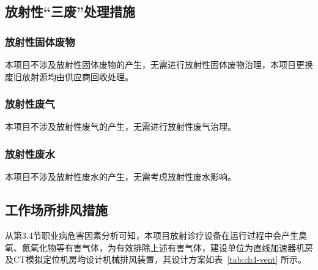 \subsection{放射性“三废”处理措施}

\subsubsection{放射性固体废物}

本项目不涉及放射性固体废物的产生，无需进行放射性固体废物治理，本项目更换废旧放射源均由供应商回收处理。

\subsubsection{放射性废气}

本项目不涉及放射性废气的产生，无需进行放射性废气治理。

\subsubsection{放射性废水}

本项目不涉及放射性废水的产生，无需考虑放射性废水影响。

\subsection{工作场所排风措施}

从第3.4节职业病危害因素分析可知，本项目放射诊疗设备在运行过程中会产生臭氧、氮氧化物等有害气体，为有效排除上述有害气体，建设单位为直线加速器机房及CT模拟定位机房均设计机械排风装置，其设计方案如表~\ref{tab:ch4-vent} 所示。



